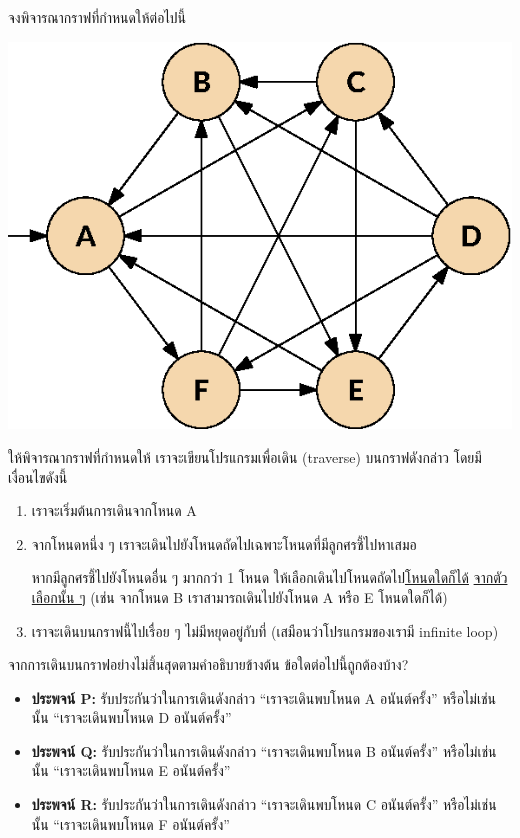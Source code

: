 \question{}

จงพิจารณากราฟที่กำหนดให้ต่อไปนี้

\begin{center}
    \includegraphics[]{figures/ponder_central_audition_infinitepath.eps}
\end{center}

ให้พิจารณากราฟที่กำหนดให้ เราจะเขียนโปรแกรมเพื่อเดิน (traverse) บนกราฟดังกล่าว โดยมีเงื่อนไขดังนี้
\begin{enumerate}
\item เราจะเริ่มต้นการเดินจากโหนด A
\item จากโหนดหนึ่ง ๆ เราจะเดินไปยังโหนดถัดไปเฉพาะโหนดที่มีลูกศรชี้ไปหาเสมอ

    หากมีลูกศรชี้ไปยังโหนดอื่น ๆ มากกว่า 1 โหนด ให้เลือกเดินไปโหนดถัดไป\uline{โหนดใดก็ได้}
    \uline{จากตัวเลือกนั้น ๆ} (เช่น จากโหนด B เราสามารถเดินไปยังโหนด A หรือ E โหนดใดก็ได้)
\item เราจะเดินบนกราฟนี้ไปเรื่อย ๆ ไม่มีหยุดอยู่กับที่ (เสมือนว่าโปรแกรมของเรามี infinite loop)
\end{enumerate}

\noindent
จากการเดินบนกราฟอย่างไม่สิ้นสุดตามคำอธิบายข้างต้น ข้อใดต่อไปนี้ถูกต้องบ้าง?

\begin{itemize}[label={$\square$}]
    \item \textbf{ประพจน์ P:} รับประกันว่าในการเดินดังกล่าว ``เราจะเดินพบโหนด A อนันต์ครั้ง'' 
        หรือไม่เช่นนั้น ``เราจะเดินพบโหนด D อนันต์ครั้ง''
    \item \textbf{ประพจน์ Q:} รับประกันว่าในการเดินดังกล่าว ``เราจะเดินพบโหนด B อนันต์ครั้ง'' 
        หรือไม่เช่นนั้น ``เราจะเดินพบโหนด E อนันต์ครั้ง''
    \item \textbf{ประพจน์ R:} รับประกันว่าในการเดินดังกล่าว ``เราจะเดินพบโหนด C อนันต์ครั้ง'' 
        หรือไม่เช่นนั้น ``เราจะเดินพบโหนด F อนันต์ครั้ง''
\end{itemize}
